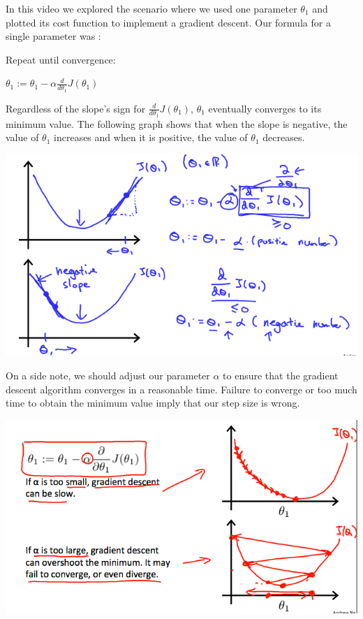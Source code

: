 \documentclass[
]{book}
\begin{document}
In this video we explored the scenario where we used one parameter \(\theta_1\) and plotted its cost function to implement a gradient descent. Our formula for a single parameter was :

Repeat until convergence:

\(\theta_1:=\theta_1-\alpha \frac{d}{d\theta_1} J(\theta_1)\)

Regardless of the slope's sign for \(\frac{d}{d\theta_1} J(\theta_1)\), \(\theta_1\) eventually converges to its minimum value. The following graph shows that when the slope is negative, the value of \(\theta_1\) increases and when it is positive, the value of \(\theta_1\) decreases.

\includegraphics{Gradien_Descent_Intution_graph_1.png}

On a side note, we should adjust our parameter \(\alpha\) to ensure that the gradient descent algorithm converges in a reasonable time. Failure to converge or too much time to obtain the minimum value imply that our step size is wrong.

\includegraphics{Gradien_Descent_Intution_graph_2.png}
\end{document}
